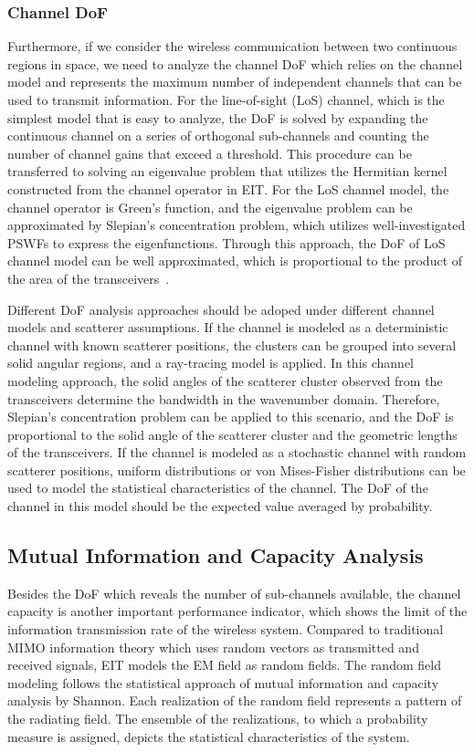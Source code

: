 \documentclass[journal,twocolumn]{IEEEtran}
\begin{document}
\subsubsection{Channel DoF}
Furthermore, if we consider the wireless communication between two continuous regions in space, we need to analyze the channel DoF which relies on the channel model and represents the maximum number of independent channels that can be used to transmit information. For the line-of-sight (LoS) channel, which is the simplest model that is easy to analyze, the DoF is solved by expanding the continuous channel on a series of orthogonal sub-channels and counting the number of channel gains that exceed a threshold. This procedure can be transferred to solving an eigenvalue problem that  utilizes the Hermitian kernel constructed from the channel operator in EIT. For the LoS channel model, the channel operator is Green's function, and the eigenvalue problem can be approximated by Slepian's concentration problem, which utilizes well-investigated PSWFs to express the eigenfunctions. Through this approach, the DoF of LoS channel model can be well approximated, which is proportional to the product of the area of the transceivers~\cite{miller2000communicating}. 

Different DoF analysis approaches should be adoped under different channel models and scatterer assumptions. 
If the channel is modeled as a deterministic channel with known scatterer positions, the clusters can be grouped into several solid angular regions, and a ray-tracing model is applied. 
In this channel modeling approach, the solid angles of the scatterer cluster observed from the transceivers determine the bandwidth in the wavenumber domain. 
Therefore, Slepian's concentration problem can be applied to this scenario, and the DoF is proportional to the solid angle of the scatterer cluster and the geometric lengths of the transceivers. 
If the channel is modeled as a stochastic channel with random scatterer positions, uniform distributions or von Mises-Fisher distributions can be used to model the statistical characteristics of the channel. 
The DoF of the channel in this model should be the expected value averaged by probability.


\subsection{Mutual Information and Capacity Analysis}
Besides the DoF which reveals the number of sub-channels available, the channel capacity is another important performance indicator, which shows the limit of the information transmission rate of the wireless system. Compared to traditional MIMO information theory which uses random vectors as transmitted and received signals, EIT models the EM field as random fields. The random field modeling follows the statistical approach of mutual information and capacity analysis by Shannon. Each realization of the random field represents a pattern of the radiating field. The ensemble of the realizations, to which a probability measure is assigned, depicts the statistical characteristics of the system. 
\end{document}
